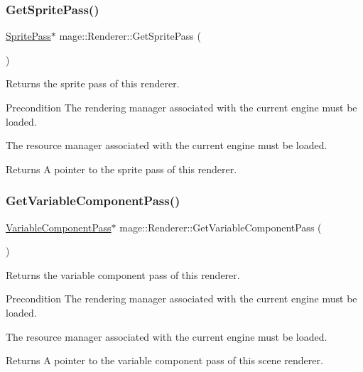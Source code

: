 \subsubsection{\texorpdfstring{Get\+Sprite\+Pass()}{GetSpritePass()}}
{\footnotesize\ttfamily \hyperlink{classmage_1_1_sprite_pass}{Sprite\+Pass}$\ast$ mage\+::\+Renderer\+::\+Get\+Sprite\+Pass (\begin{DoxyParamCaption}{ }\end{DoxyParamCaption})}

Returns the sprite pass of this renderer.

\begin{DoxyPrecond}{Precondition}
The rendering manager associated with the current engine must be loaded. 

The resource manager associated with the current engine must be loaded. 
\end{DoxyPrecond}
\begin{DoxyReturn}{Returns}
A pointer to the sprite pass of this renderer. 
\end{DoxyReturn}
\hypertarget{classmage_1_1_renderer_abc9ee209c84f87d3186b4390162b9be1}{}\label{classmage_1_1_renderer_abc9ee209c84f87d3186b4390162b9be1} 
\subsubsection{\texorpdfstring{Get\+Variable\+Component\+Pass()}{GetVariableComponentPass()}}
{\footnotesize\ttfamily \hyperlink{classmage_1_1_variable_component_pass}{Variable\+Component\+Pass}$\ast$ mage\+::\+Renderer\+::\+Get\+Variable\+Component\+Pass (\begin{DoxyParamCaption}{ }\end{DoxyParamCaption})}

Returns the variable component pass of this renderer.

\begin{DoxyPrecond}{Precondition}
The rendering manager associated with the current engine must be loaded. 

The resource manager associated with the current engine must be loaded. 
\end{DoxyPrecond}
\begin{DoxyReturn}{Returns}
A pointer to the variable component pass of this scene renderer. 
\end{DoxyReturn}
\hypertarget{classmage_1_1_renderer_aaea6458a480c62f8b0b911f16e5058b9}{}\label{classmage_1_1_renderer_aaea6458a480c62f8b0b911f16e5058b9} 
